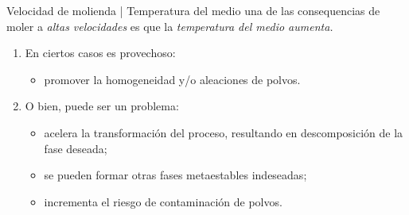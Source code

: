 \documentclass[%
spanish,
    progressbar=head,
background=dark,
subsectionpage
]{beamer}
\begin{document}
\begin{frame}{Velocidad de molienda | Temperatura del medio}
    una de las consequencias de moler a \emph{altas velocidades} es que la \emph{temperatura del medio aumenta.}
    \begin{enumerate}
            \item En ciertos casos es provechoso:
            \begin{itemize}
                \item promover la homogeneidad y/o aleaciones de polvos.
            \end{itemize}
            \item O bien, puede ser un problema:
            \begin{itemize}
                \item acelera la transformación del proceso, resultando en descomposición de la fase deseada;
                \item se pueden formar otras fases metaestables indeseadas;
                \item incrementa el riesgo de contaminación de polvos.
            \end{itemize}
        \end{enumerate}
\end{frame}
\end{document}
